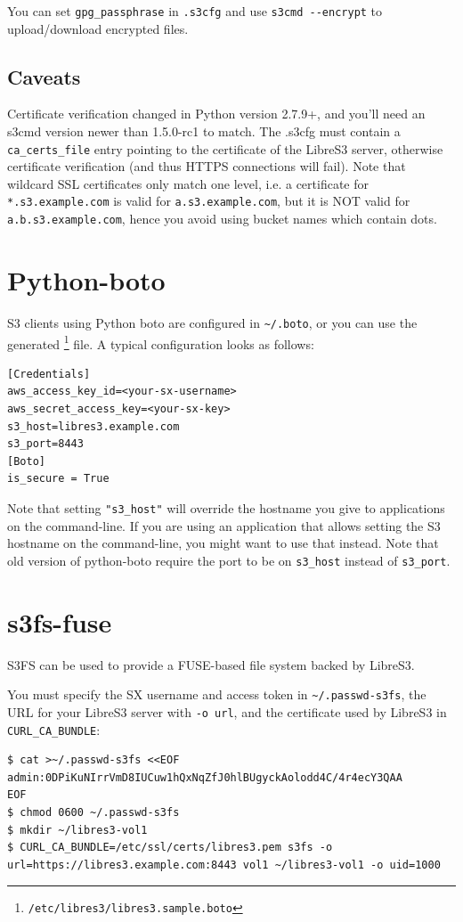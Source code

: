 You can set \verb|gpg_passphrase| in \verb|.s3cfg| and use
\verb|s3cmd --encrypt| to upload/download encrypted files.

\subsection*{Caveats}

Certificate verification changed in Python version 2.7.9+, and you'll need
an s3cmd version newer than 1.5.0-rc1 to match.
The .s3cfg must contain a \verb|ca_certs_file| entry pointing to the certificate
of the LibreS3 server, otherwise certificate verification (and thus HTTPS
connections will fail).
Note that wildcard SSL certificates only match one level, i.e.
a certificate for \verb|*.s3.example.com| is valid for \verb|a.s3.example.com|,
but it is NOT valid for \verb|a.b.s3.example.com|, hence you avoid using
bucket names which contain dots.

\section*{Python-boto}

S3 clients using Python boto are configured in \verb|~/.boto|,
or you can use the generated \footnote{\verb|/etc/libres3/libres3.sample.boto|} file.
A typical configuration looks as follows:

\begin{lstlisting}
[Credentials]
aws_access_key_id=<your-sx-username>
aws_secret_access_key=<your-sx-key>
s3_host=libres3.example.com
s3_port=8443
[Boto]
is_secure = True
\end{lstlisting}


Note that setting \verb|"s3_host"| will override the hostname you give to
applications on the command-line. If you are using an application that allows
setting the S3 hostname on the command-line, you might want to use that instead.
Note that old version of python-boto require the port to be on \verb|s3_host|
instead of \verb|s3_port|.

\section*{s3fs-fuse}

S3FS can be used to provide a FUSE-based file system backed by LibreS3.

You must specify the SX username and access token in \verb|~/.passwd-s3fs|,
the URL for your LibreS3 server with \verb|-o url|, and the certificate
used by LibreS3 in \verb|CURL_CA_BUNDLE|:
\begin{lstlisting}
$ cat >~/.passwd-s3fs <<EOF
admin:0DPiKuNIrrVmD8IUCuw1hQxNqZfJ0hlBUgyckAolodd4C/4r4ecY3QAA
EOF
$ chmod 0600 ~/.passwd-s3fs
$ mkdir ~/libres3-vol1
$ CURL_CA_BUNDLE=/etc/ssl/certs/libres3.pem s3fs -o url=https://libres3.example.com:8443 vol1 ~/libres3-vol1 -o uid=1000
\end{lstlisting}

